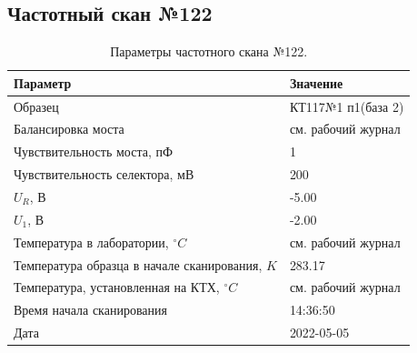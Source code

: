 \subsection{Частотный скан №122}
\begin{table}[!ht]
    \centering
    \caption{Параметры частотного скана №122.}
    \begin{tabular}{|l|l|}
        \hline
        Параметр                                       & Значение                  \\ \hline
        Образец                                        & КТ117№1 п1(база 2)        \\ \hline
        Балансировка моста                             & см. рабочий журнал        \\ \hline
        Чувствительность моста, пФ                     & 1                         \\ \hline
        Чувствительность селектора, мВ                 & 200                       \\ \hline
        $U_R$, В                                       & -5.00                     \\ \hline
        $U_1$, В                                       & -2.00                     \\ \hline
        Температура в лаборатории, $^\circ C$          & см. рабочий журнал        \\ \hline
        Температура образца в начале сканирования, $K$ & 283.17                    \\ \hline
        Температура, установленная на КТХ, $^\circ C$  & см. рабочий журнал        \\ \hline
        Время начала сканирования                      & 14:36:50                  \\ \hline
        Дата                                           & 2022-05-05                \\ \hline
    \end{tabular}
    \label{table:frequency_scan_122}
\end{table}

